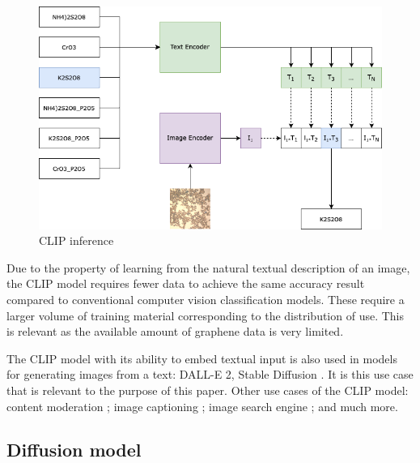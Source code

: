 \documentclass[runningheads]{llncs}
\begin{document}
\par
\begin{figure}[h]
    \centering
    \includegraphics[scale=0.5]{img/CLIP_inference.png}
    \caption{CLIP inference}   %
    \label{img:clip_inference}
\end{figure}

Due to the property of learning from the natural textual description of an image, the CLIP model requires fewer data to achieve the same accuracy result compared to conventional computer vision classification models. These require a larger volume of training material corresponding to the distribution of use. This is relevant as the available amount of graphene data is very limited.
\par
The CLIP model with its ability to embed textual input is also used in models for generating images from a text: DALL-E 2, Stable Diffusion \cite{DALLE,LatentDiffusion}. It is this use case that is relevant to the purpose of this paper. Other use cases of the CLIP model: content moderation \cite{ContentModeration}; image captioning \cite{ImageCaptioning}; image search engine \cite{ImageSearch}; and much more.

\subsection{Diffusion model}
\end{document}
